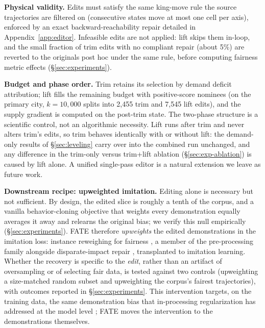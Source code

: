 \textbf{Physical validity.}\label{sec:phys-validity} Edits must satisfy the same king-move rule the
source trajectories are filtered on (consecutive states move at most one
cell per axis), enforced by an exact backward-reachability repair detailed
in Appendix~\ref{app:editor}. Infeasible edits are not applied: lift skips
them in-loop, and the small fraction of trim edits with no compliant repair
(about 5\%) are reverted to the originals post hoc under the same rule,
before computing fairness metric effects (\S\ref{sec:experiments}).

\textbf{Budget and phase order.} Trim retains its selection by demand
deficit attribution; lift fills the remaining budget with positive-score
nominees
(on the primary city, $k = 10{,}000$ splits into 2{,}455 trim and 7{,}545 lift
edits), and the supply gradient is computed on the post-trim state.
The two-phase structure is a scientific control, not an algorithmic
necessity. Lift runs after trim and never alters trim's edits, so trim
behaves identically with or without lift: the demand-only results of
\S\ref{sec:leveling} carry over into the combined run unchanged, and any
difference in the trim-only versus trim+lift ablation
(\S\ref{sec:exp-ablation}) is caused by lift alone. A unified single-pass editor is a natural extension we
leave as future work.

\textbf{Downstream recipe: upweighted imitation.}\label{sec:downstream}
Editing alone is necessary but not sufficient. By design, the edited slice is
roughly a tenth of the corpus, and a vanilla behavior-cloning objective that
weights every demonstration equally averages it away and relearns the original
bias; we verify this null empirically (\S\ref{sec:experiments}).
FATE therefore \emph{upweights} the edited
demonstrations in the imitation loss: instance reweighing for fairness
\cite{kamirancalders2012}, a member of the pre-processing family alongside
disparate-impact repair \cite{feldman2015}, transplanted to imitation
learning. Whether the recovery is specific to the \emph{edit}, rather than an
artifact of oversampling or of selecting fair data, is tested against two
controls (upweighting a size-matched random subset and upweighting the
corpus's fairest trajectories), with outcomes reported in
\S\ref{sec:experiments}. This intervention targets, on the training data, the
same demonstration bias that in-processing regularization has addressed at the
model level \cite{zheng2023}; FATE moves the intervention to the
demonstrations themselves.
